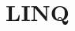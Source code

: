 \documentclass{scrreprt}
\begin{document}
%
%
%
%
%
%
%
%
%
%
%
%
%

\chapter{LINQ}

\end{document}
